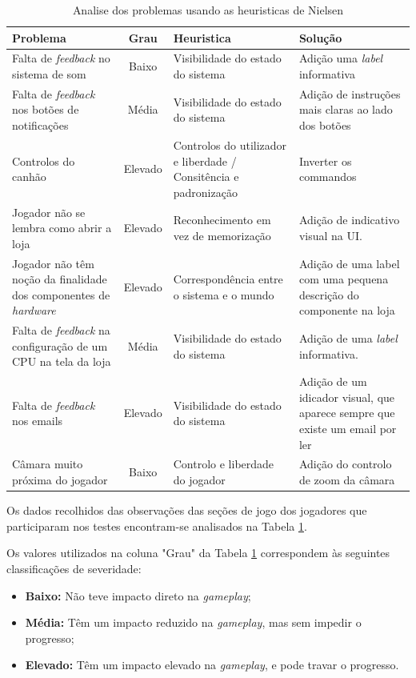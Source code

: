 \begin{table}[H]
    \centering
    \begin{tabular}{|p{4.5cm}|c|p{3cm}|p{4.5cm}|}
        \hline
        \textbf{Problema} & \textbf{Grau} & \textbf{Heuristica} & \textbf{Solução} \\ \hline
        Falta de \textit{feedback} no sistema de som & Baixo & Visibilidade do estado do sistema & Adição uma \textit{label} informativa \\ \hline
        Falta de \textit{feedback} nos botões de notificações & Média & Visibilidade do estado do sistema & Adição de instruções mais claras ao lado dos botões \\ \hline
        Controlos do canhão & Elevado & Controlos do utilizador e liberdade / Consitência e padronização & Inverter os commandos \\ \hline
        Jogador não se lembra como abrir a loja & Elevado & Reconhecimento em vez de memorização & Adição de indicativo visual na \ac{UI}. \\ \hline
        Jogador não têm noção da finalidade dos componentes de \textit{hardware} & Elevado & Correspondência entre o sistema e o mundo & Adição de uma label com uma pequena descrição do componente na loja \\ \hline
        Falta de \textit{feedback} na configuração de um \ac{CPU} na tela da loja & Média & Visibilidade do estado do sistema & Adição de uma \textit{label} informativa. \\ \hline
        Falta de \textit{feedback} nos emails & Elevado & Visibilidade do estado do sistema & Adição de um idicador visual, que aparece sempre que existe um email por ler \\ \hline
        Câmara muito próxima do jogador & Baixo & Controlo e liberdade do jogador & Adição do controlo de zoom da câmara \\ \hline
    \end{tabular}
    \caption{Analise dos problemas usando as heuristicas de Nielsen}
    \label{tab:DadosNielsen}
\end{table}

Os dados recolhidos das observações das seções de jogo dos jogadores que participaram nos testes encontram-se analisados
na Tabela \ref{tab:DadosNielsen}.

Os valores utilizados na coluna "Grau" da Tabela \ref{tab:DadosNielsen} correspondem às seguintes classificações de severidade:
\begin{itemize}
    \item \textbf{Baixo:} Não teve impacto direto na \textit{gameplay};
    \item \textbf{Média:} Têm um impacto reduzido na \textit{gameplay}, mas sem impedir o progresso;
    \item \textbf{Elevado:} Têm um impacto elevado na \textit{gameplay}, e pode travar o progresso.
\end{itemize}



